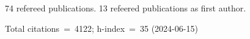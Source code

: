 74 refereed publications. 13 refeered publications as first author.

Total citations~=~4122; h-index~=~35 (2024-06-15)